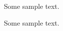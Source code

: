 \documentclass{article}
\providecommand{\TeXParserLibToImage}[2][]{#2}
\begin{document}
Some sample text.

\TeXParserLibToImage[type={image/png}]{Some sample text.}
\end{document}
